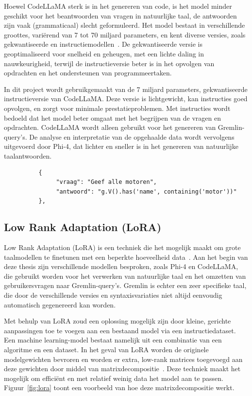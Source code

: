 Hoewel CodeLLaMA sterk is in het genereren van code, is het model minder geschikt voor het beantwoorden van vragen in natuurlijke taal, de antwoorden zijn vaak (grammaticaal) slecht geformuleerd. 
Het model bestaat in verschillende groottes, variërend van 7 tot 70 miljard parameters, en kent diverse versies, zoals gekwantiseerde en instructiemodellen~\autocite{HuggingFaceCodellama}. 
De gekwantiseerde versie is geoptimaliseerd voor snelheid en geheugen, met een lichte daling in nauwkeurigheid, terwijl de instructieversie beter is in het opvolgen van opdrachten en het ondersteunen van programmeertaken.

In dit project wordt gebruikgemaakt van de 7 miljard parameters, gekwantiseerde instructieversie van CodeLLaMA. 
Deze versie is lichtgewicht, kan instructies goed opvolgen, en zorgt voor minimale prestatieproblemen. 
Met instructies wordt bedoeld dat het model beter omgaat met het begrijpen van de vragen en opdrachten. 
CodeLLaMA wordt alleen gebruikt voor het genereren van Gremlin-query's. 
De analyse en interpretatie van de opgehaalde data wordt vervolgens uitgevoerd door Phi-4, dat lichter en sneller is in het genereren van natuurlijke taalantwoorden.

\begin{listing} [H]
     \begin{verbatim}
          {
               "vraag": "Geef alle motoren",
               "antwoord": "g.V().has('name', containing('motor'))"
          },
     \end{verbatim}
     \caption[Voorbeeld van een JSON context bestand]{\label{fig:RAGJSON}Voorbeeld JSON met vraag en query.}
\end{listing} 

\subsection{Low Rank Adaptation (LoRA)}{\label{sec:LORA}}
Low Rank Adaptation (LoRA) is een techniek die het mogelijk maakt om grote taalmodellen te finetunen met een beperkte hoeveelheid data~\autocite{Cloudflare}. 
Aan het begin van deze thesis zijn verschillende modellen besproken, zoals Phi-4 en CodeLLaMA, die gebruikt worden voor het verwerken van natuurlijke taal en het omzetten van gebruikersvragen naar Gremlin-query's. 
Gremlin is echter een zeer specifieke taal, die door de verschillende versies en syntaxisvariaties niet altijd eenvoudig automatisch gegenereerd kan worden.

Met behulp van LoRA zoud een oplossing mogelijk zijn door kleine, gerichte aanpassingen toe te voegen aan een bestaand model via een instructiedataset. 
Een machine learning-model bestaat namelijk uit een combinatie van een algoritme en een dataset. 
In het geval van LoRA worden de originele modelgewichten bevroren en worden er extra, low-rank matrices toegevoegd aan deze gewichten door middel van matrixdecompositie~\autocite{Thiyagarajan2024}. 
Deze techniek maakt het mogelijk om efficiënt en met relatief weinig data het model aan te passen. 
Figuur~\ref{fig:lora} toont een voorbeeld van hoe deze matrixdecompositie werkt.

